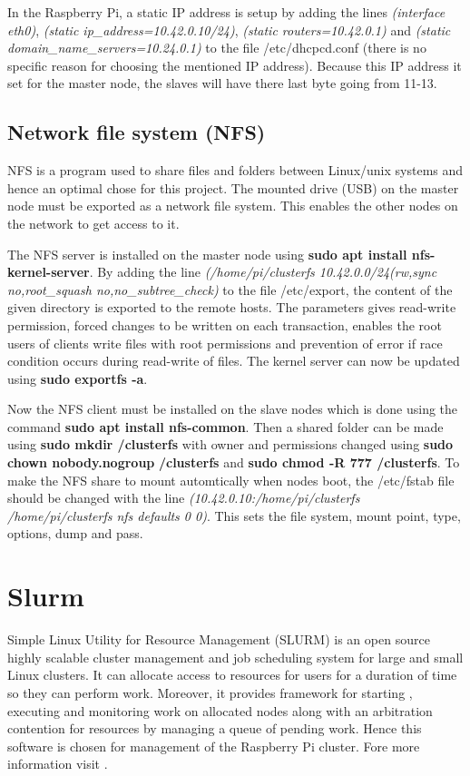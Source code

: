 \documentclass[../Head/Report.tex]{subfiles}
\begin{document}
In the Raspberry Pi, a static IP address is setup by adding the lines \textit{(interface eth0)}, \textit{(static ip\_address=10.42.0.10/24)}, \textit{(static routers=10.42.0.1)} and \textit{(static domain\_name\_servers=10.24.0.1)} to the file /etc/dhcpcd.conf (there is no specific reason for choosing the mentioned IP address). Because this IP address it set for the master node, the slaves will have there last byte going from 11-13.

\subsection{Network file system (NFS)} 

NFS is a program used to share files and folders between Linux/unix systems and hence an optimal chose for this project. The mounted drive (USB) on the master node must be exported as a network file system. This enables the other nodes on the network to get access to it. 

The NFS server is installed on the master node using \textbf{sudo apt install nfs-kernel-server}. By adding the line \textit{(/home/pi/clusterfs 10.42.0.0/24(rw,sync no,root\_squash no,no\_subtree\_check)} to the file /etc/export, the content of the given directory is exported to the remote hosts. The parameters gives read-write permission, forced changes to be written on each transaction, enables the root users of clients write files with root permissions and prevention of error if race condition occurs during read-write of files. The kernel server can now be updated using \textbf{sudo exportfs -a}. 

Now the NFS client must be installed on the slave nodes which is done using the command \textbf{sudo apt install nfs-common}. Then a shared folder can be made using \textbf{sudo mkdir /clusterfs} with owner and permissions changed using \textbf{sudo chown nobody.nogroup} \textbf{/clusterfs} and \textbf{sudo chmod -R 777 /clusterfs}. To make the NFS share to mount automtically when nodes boot, the /etc/fstab file should be changed with the line \textit{(10.42.0.10:/home/pi/clusterfs /home/pi/clusterfs nfs defaults 0 0)}. This sets the file system, mount point, type, options, dump and pass. \cite{NFS}

\section{Slurm}
\label{sec:slurm}

Simple Linux Utility for Resource Management (SLURM) is an open source highly scalable cluster management and job scheduling system for large and small Linux clusters. It can allocate access to resources for users for a duration of time so they can perform work. Moreover, it provides framework for starting , executing and monitoring work on allocated nodes along with an arbitration contention for resources by managing a queue of pending work. Hence this software is chosen for management of the Raspberry Pi cluster. Fore more information visit \cite{SLURM}. 
\end{document}
